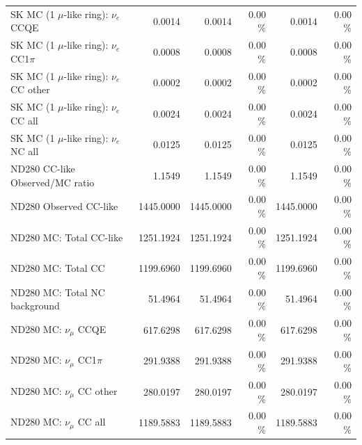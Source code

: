 \begin{table}
\begin{tabular}{| l | r | r  r | r  r |}
                             SK MC (1 $\mu$-like ring): $\nu_{e}$ CCQE &          0.0014 &          0.0014 &  0.00 \%  &          0.0014 &  0.00 \%  \\ 
                         SK MC (1 $\mu$-like ring): $\nu_{e}$ CC1$\pi$ &          0.0008 &          0.0008 &  0.00 \%  &          0.0008 &  0.00 \%  \\ 
                         SK MC (1 $\mu$-like ring): $\nu_{e}$ CC other &          0.0002 &          0.0002 &  0.00 \%  &          0.0002 &  0.00 \%  \\ 
                           SK MC (1 $\mu$-like ring): $\nu_{e}$ CC all &          0.0024 &          0.0024 &  0.00 \%  &          0.0024 &  0.00 \%  \\ 
                           SK MC (1 $\mu$-like ring): $\nu_{e}$ NC all &          0.0125 &          0.0125 &  0.00 \%  &          0.0125 &  0.00 \%  \\ 
\hline
                                       ND280 CC-like Observed/MC ratio &          1.1549 &          1.1549 &  0.00 \%  &          1.1549 &  0.00 \%  \\ 
                                                ND280 Observed CC-like &       1445.0000 &       1445.0000 &  0.00 \%  &       1445.0000 &  0.00 \%  \\ 
                                               ND280 MC: Total CC-like &       1251.1924 &       1251.1924 &  0.00 \%  &       1251.1924 &  0.00 \%  \\ 
                                                    ND280 MC: Total CC &       1199.6960 &       1199.6960 &  0.00 \%  &       1199.6960 &  0.00 \%  \\ 
                                         ND280 MC: Total NC background &         51.4964 &         51.4964 &  0.00 \%  &         51.4964 &  0.00 \%  \\ 
\hline
                                            ND280 MC: $\nu_{\mu}$ CCQE &        617.6298 &        617.6298 &  0.00 \%  &        617.6298 &  0.00 \%  \\ 
                                        ND280 MC: $\nu_{\mu}$ CC1$\pi$ &        291.9388 &        291.9388 &  0.00 \%  &        291.9388 &  0.00 \%  \\ 
                                        ND280 MC: $\nu_{\mu}$ CC other &        280.0197 &        280.0197 &  0.00 \%  &        280.0197 &  0.00 \%  \\ 
                                          ND280 MC: $\nu_{\mu}$ CC all &       1189.5883 &       1189.5883 &  0.00 \%  &       1189.5883 &  0.00 \%  \\ 

\end{tabular}
\end{table}
